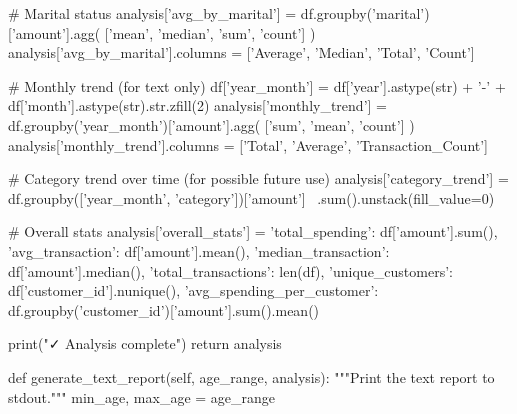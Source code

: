         # Marital status
        analysis['avg_by_marital'] = df.groupby('marital')['amount'].agg(
            ['mean', 'median', 'sum', 'count']
        )
        analysis['avg_by_marital'].columns = ['Average', 'Median', 'Total', 'Count']

        # Monthly trend (for text only)
        df['year_month'] = df['year'].astype(str) + '-' + df['month'].astype(str).str.zfill(2)
        analysis['monthly_trend'] = df.groupby('year_month')['amount'].agg(
            ['sum', 'mean', 'count']
        )
        analysis['monthly_trend'].columns = ['Total', 'Average', 'Transaction_Count']

        # Category trend over time (for possible future use)
        analysis['category_trend'] = df.groupby(['year_month', 'category'])['amount'] \
                                       .sum().unstack(fill_value=0)

        # Overall stats
        analysis['overall_stats'] = {
            'total_spending': df['amount'].sum(),
            'avg_transaction': df['amount'].mean(),
            'median_transaction': df['amount'].median(),
            'total_transactions': len(df),
            'unique_customers': df['customer_id'].nunique(),
            'avg_spending_per_customer': df.groupby('customer_id')['amount'].sum().mean()
        }

        print("✓ Analysis complete")
        return analysis

    def generate_text_report(self, age_range, analysis):
        """Print the text report to stdout."""
        min_age, max_age = age_range

